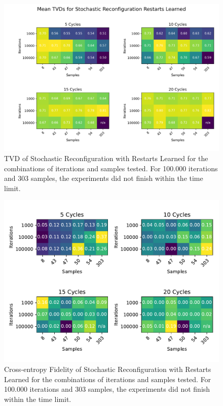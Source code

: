\begin{figure}[H]
  \centering
  \includegraphics[width=\textwidth]{figures/results/SR-restarts-learned/tvd_heatmap.png}
  \caption[TVD of Stochastic Reconfiguration with Restarts Learned]{TVD of Stochastic 
  Reconfiguration with Restarts Learned for the combinations of iterations and samples tested.
  For 100.000 iterations and 303 samples, the experiments did not finish within the time limit.}
  \label{fig:sr_tvd}
\end{figure}

\begin{figure}[H]
  \centering
  \includegraphics[width=\textwidth]{figures/results/SR-restarts-learned/fxeb_heatmap.pdf}
  \caption[Cross-entropy Fidelity of Stochastic Reconfiguration with Restarts Learned]{Cross-entropy Fidelity of Stochastic 
  Reconfiguration with Restarts Learned for the combinations of iterations and samples tested.
  For 100.000 iterations and 303 samples, the experiments did not finish within the time limit.}
  \label{fig:sr_tvd}
\end{figure}


